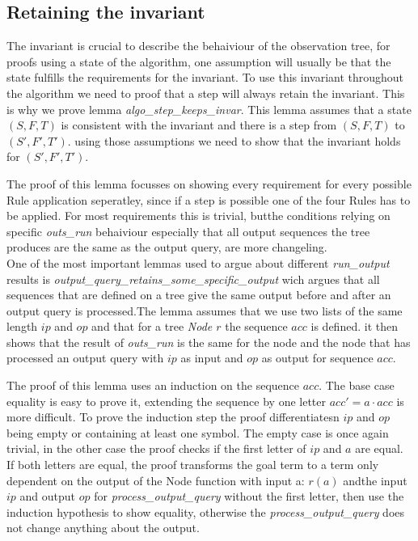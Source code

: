 \subsection{Retaining the invariant}
The invariant is crucial to describe the behaiviour of the observation tree, for proofs using a state of the algorithm, one assumption will usually be that the state fulfills the requirements for the invariant. To use this invariant throughout the algorithm we need to proof that a step will always retain the invariant. This is why we prove lemma \textit{algo\_step\_keeps\_invar}. This lemma assumes that a state $(S,F,T)$ is consistent with the invariant and there is a step from $(S,F,T)$ to $(S',F',T')$. using those assumptions we need to show that the invariant holds for $(S',F',T')$. 
\begin{myisabelle}
	\retaininvar
\end{myisabelle}
The proof of this lemma focusses on showing every requirement for every possible Rule application seperatley, since if a step is possible one of the four Rules has to be applied. For most requirements this is trivial, butthe conditions relying on specific \textit{outs\_run} behaiviour especially that all output sequences the tree produces are the same as the output query, are more changeling.\\ 
One of the most important lemmas used to argue about different \textit{run\_output} results is \textit{output\_query\_retains\_some\_specific\_output} wich argues that all sequences that are defined on a tree give the same output before and after an output query is processed.The lemma assumes that we use two lists of the same length $ip$ and $op$ and that for a tree \textit{Node $r$} the sequence $acc$ is defined. it then shows that the result of \textit{outs\_run} is the same for the node and the node that has processed an output query with $ip$ as input and $op$ as output for sequence $acc$.
\begin{myisabelle}
	\opqueryretains
\end{myisabelle} 
The proof of this lemma uses an induction on the sequence $acc$. The base case equality is easy to prove it, extending the sequence by one letter $acc'=a \cdot acc$ is more difficult. To prove the induction step the proof differentiatesn $ip$ and $op$ being empty or containing at least one symbol. The empty case is once again trivial, in the other case the proof checks if the first letter of $ip$ and $a$ are equal. If both letters are equal, the proof transforms the goal term to a term only dependent on the output of the Node function with input a: $r(a)$ andthe input $ip$ and output $op$ for \textit{process\_output\_query} without the first letter, then use the induction hypothesis to show equality, otherwise the \textit{process\_output\_query} does not change anything about the output. \\
